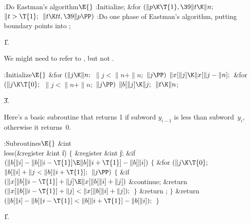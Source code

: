 \Y\B\4:Do Eastman's algorithm\X${}\E{}$\6
:Initialize\X;\6
\&{for} ${}(\|p\K\T{1},\39\|t\K\|n;{}$ ${}\|t>\T{1};{}$ ${}\|t\K\\{tt},\39\|p%
\PP){}$\1\5
:Do one phase of Eastman's algorithm, putting  boundary points
into \X;\2\par
\U1.\fi

We might need to refer to , but not .

\Y\B\4:Initialize\X${}\E{}$\6
\&{for} ${}(\|j\K\|n;{}$ ${}\|j<\|n+\|n;{}$ ${}\|j\PP){}$\1\5
${}\|x[\|j]\K\|x[\|j-\|n];{}$\2\6
\&{for} ${}(\|j\K\T{0};{}$ ${}\|j<\|n+\|n;{}$ ${}\|j\PP){}$\1\5
${}\|b[\|j]\K\|j;{}$\2\6
${}\|t\K\|n{}$;\par
\U3.\fi

Here's a basic subroutine that returns 1 if
subword $y_{i-1}$ is less than
subword~$y_i$, otherwise it returns~0.

\Y\B\4:Subroutines\X${}\E{}$\6
\&{int} \\{less}(\&{register} \&{int} \|i)\1\1\2\2\6
${}\{{}$\1\6
\&{register} \&{int} \|j;\7
\&{if} ${}(\|b[\|i]-\|b[\|i-\T{1}]\E\|b[\|i+\T{1}]-\|b[\|i]){}$\5
${}\{{}$\1\6
\&{for} ${}(\|j\K\T{0};{}$ ${}\|b[\|i]+\|j<\|b[\|i+\T{1}];{}$ ${}\|j\PP){}$\5
${}\{{}$\1\6
\&{if} ${}(\|x[\|b[\|i-\T{1}]+\|j]\E\|x[\|b[\|i]+\|j]){}$\1\5
\&{continue};\2\6
\&{return} ${}(\|x[\|b[\|i-\T{1}]+\|j]<\|x[\|b[\|i]+\|j]);{}$\6
\4${}\}{}$\2\6
\&{return} ;\6
\4${}\}{}$\2\6
\&{return} ${}(\|b[\|i]-\|b[\|i-\T{1}]<\|b[\|i+\T{1}]-\|b[\|i]);{}$\6
\4${}\}{}$\2\par
\U1.\fi

